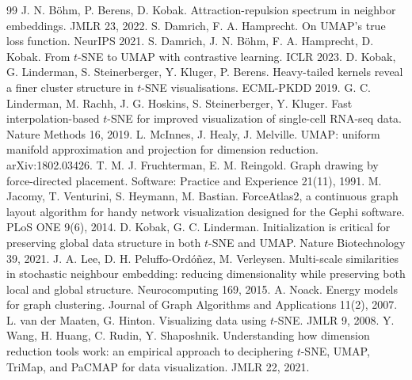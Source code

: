 \documentclass[11pt]{article}
\begin{document}

\begin{thebibliography}{99}\small
{} J. N. B\"ohm, P. Berens, D. Kobak. Attraction-repulsion spectrum in neighbor embeddings. JMLR 23, 2022.
 S. Damrich, F. A. Hamprecht. On UMAP's true loss function. NeurIPS 2021.
 S. Damrich, J. N. B\"ohm, F. A. Hamprecht, D. Kobak. From $t$-SNE to UMAP with contrastive learning. ICLR 2023.
 D. Kobak, G. Linderman, S. Steinerberger, Y. Kluger, P. Berens. Heavy-tailed kernels reveal a finer cluster structure in $t$-SNE visualisations. ECML-PKDD 2019.
 G. C. Linderman, M. Rachh, J. G. Hoskins, S. Steinerberger, Y. Kluger. Fast interpolation-based $t$-SNE for improved visualization of single-cell RNA-seq data. Nature Methods 16, 2019.
 L. McInnes, J. Healy, J. Melville. UMAP: uniform manifold approximation and projection for dimension reduction. arXiv:1802.03426.
 T. M. J. Fruchterman, E. M. Reingold. Graph drawing by force-directed placement. Software: Practice and Experience 21(11), 1991.
 M. Jacomy, T. Venturini, S. Heymann, M. Bastian. ForceAtlas2, a continuous graph layout algorithm for handy network visualization designed for the Gephi software. PLoS ONE 9(6), 2014.
 D. Kobak, G. C. Linderman. Initialization is critical for preserving global data structure in both $t$-SNE and UMAP. Nature Biotechnology 39, 2021.
 J. A. Lee, D. H. Peluffo-Ord\'o\~nez, M. Verleysen. Multi-scale similarities in stochastic neighbour embedding: reducing dimensionality while preserving both local and global structure. Neurocomputing 169, 2015.
 A. Noack. Energy models for graph clustering. Journal of Graph Algorithms and Applications 11(2), 2007.
 L. van der Maaten, G. Hinton. Visualizing data using $t$-SNE. JMLR 9, 2008.
 Y. Wang, H. Huang, C. Rudin, Y. Shaposhnik. Understanding how dimension reduction tools work: an empirical approach to deciphering $t$-SNE, UMAP, TriMap, and PaCMAP for data visualization. JMLR 22, 2021.
\end{thebibliography}
\end{document}

